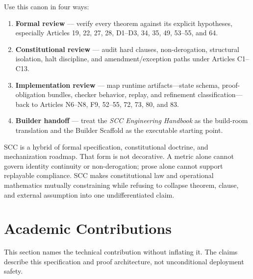 \documentclass[10pt,oneside]{article}
\theoremstyle{definition}
\theoremstyle{remark}
\begin{document}
Use this canon in four ways:
\begin{enumerate}
  \item \textbf{Formal review} --- verify every theorem against its explicit hypotheses, especially Articles 19, 22, 27, 28, D1--D3, 34, 35, 49, 53--55, and 64.
  \item \textbf{Constitutional review} --- audit hard clauses, non-derogation, structural isolation, halt discipline, and amendment/exception paths under Articles C1--C13.
  \item \textbf{Implementation review} --- map runtime artifacts---state schema, proof-obligation bundles, checker behavior, replay, and refinement classification---back to Articles N6--N8, F9, 52--55, 72, 73, 80, and 83.
  \item \textbf{Builder handoff} --- treat the \emph{SCC Engineering Handbook} as the build-room translation and the Builder Scaffold as the executable starting point.
\end{enumerate}

SCC is a hybrid of formal specification, constitutional doctrine, and mechanization roadmap. That form is not decorative. A metric alone cannot govern identity continuity or non-derogation; prose alone cannot support replayable compliance. SCC makes constitutional law and operational mathematics mutually constraining while refusing to collapse theorem, clause, and external assumption into one undifferentiated claim.

\section{Academic Contributions}
This section names the technical contribution without inflating it. The claims describe this specification and proof architecture, not unconditional deployment safety.
\end{document}
